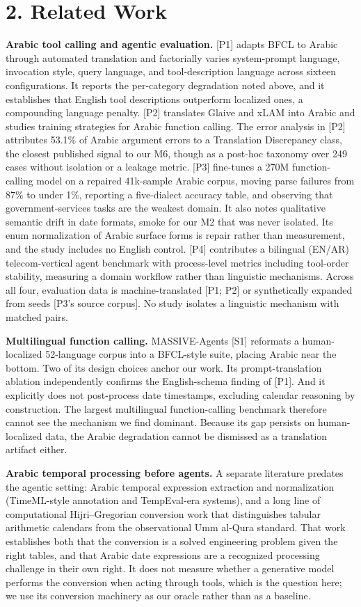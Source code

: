 \documentclass[11pt]{article}
\begin{document}
\section{2. Related Work}\label{related-work}

\textbf{Arabic tool calling and agentic evaluation.} {[}P1{]} adapts BFCL to Arabic through automated translation and factorially varies system-prompt language, invocation style, query language, and tool-description language across sixteen configurations. It reports the per-category degradation noted above, and it establishes that English tool descriptions outperform localized ones, a compounding language penalty. {[}P2{]} translates Glaive and xLAM into Arabic and studies training strategies for Arabic function calling. The error analysis in {[}P2{]} attributes 53.1\% of Arabic argument errors to a Translation Discrepancy class, the closest published signal to our M6, though as a post-hoc taxonomy over 249 cases without isolation or a leakage metric. {[}P3{]} fine-tunes a 270M function-calling model on a repaired 41k-sample Arabic corpus, moving parse failures from 87\% to under 1\%, reporting a five-dialect accuracy table, and observing that government-services tasks are the weakest domain. It also notes qualitative semantic drift in date formats, smoke for our M2 that was never isolated. Its enum normalization of Arabic surface forms is repair rather than measurement, and the study includes no English control. {[}P4{]} contributes a bilingual (EN/AR) telecom-vertical agent benchmark with process-level metrics including tool-order stability, measuring a domain workflow rather than linguistic mechanisms. Across all four, evaluation data is machine-translated {[}P1; P2{]} or synthetically expanded from seeds {[}P3's source corpus{]}. No study isolates a linguistic mechanism with matched pairs.

\textbf{Multilingual function calling.} MASSIVE-Agents {[}S1{]} reformats a human-localized 52-language corpus into a BFCL-style suite, placing Arabic near the bottom. Two of its design choices anchor our work. Its prompt-translation ablation independently confirms the English-schema finding of {[}P1{]}. And it explicitly does not post-process date timestamps, excluding calendar reasoning by construction. The largest multilingual function-calling benchmark therefore cannot see the mechanism we find dominant. Because its gap persists on human-localized data, the Arabic degradation cannot be dismissed as a translation artifact either.

\textbf{Arabic temporal processing before agents.} A separate literature predates the agentic setting: Arabic temporal expression extraction and normalization (TimeML-style annotation and TempEval-era systems), and a long line of computational Hijri--Gregorian conversion work that distinguishes tabular arithmetic calendars from the observational Umm al-Qura standard. That work establishes both that the conversion is a solved engineering problem given the right tables, and that Arabic date expressions are a recognized processing challenge in their own right. It does not measure whether a generative model performs the conversion when acting through tools, which is the question here; we use its conversion machinery as our oracle rather than as a baseline.
\end{document}
